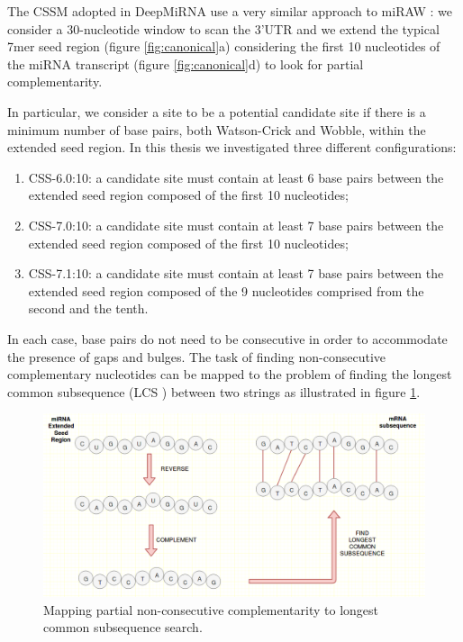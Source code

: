 The CSSM adopted in DeepMiRNA use a very similar approach to miRAW \cite{miraw}: we consider a 30-nucleotide window to scan the 3'UTR and we extend the typical 7mer seed region (figure \ref{fig:canonical}a) considering the first 10 nucleotides of the miRNA transcript (figure \ref{fig:canonical}d) to look for partial complementarity.

In particular, we consider a site to be a potential candidate site if there is a minimum number of base pairs, both Watson-Crick and Wobble, within the extended seed region. In this thesis we investigated three different configurations: 

\begin{enumerate}
	\item CSS-6.0:10: a candidate site must contain at least 6 base pairs between the extended seed region composed of the first 10 nucleotides;
	\item CSS-7.0:10: a candidate site must contain at least 7 base pairs between the extended seed region composed of the first 10 nucleotides;
	\item CSS-7.1:10: a candidate site must contain at least 7 base pairs between the extended seed region composed of the 9 nucleotides comprised from the second and the tenth. 
	
\end{enumerate}

In each case, base pairs do not need to be consecutive in order to accommodate the presence of gaps and bulges. The task of finding non-consecutive complementary nucleotides can be mapped to the problem of finding the longest common subsequence (LCS ) between two strings as illustrated in figure \ref{fig:lcs}.

\begin{figure}[hbt!]
	\centering
	\includegraphics[width=1\textwidth]{Figures/lcs}
	\caption{Mapping partial non-consecutive complementarity to longest common subsequence search.}
	\label{fig:lcs}
\end{figure}

